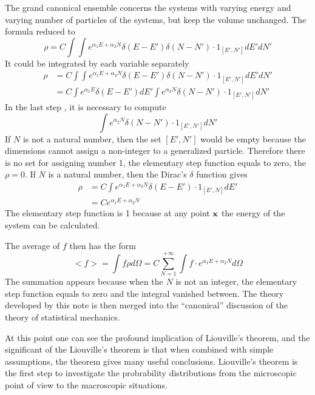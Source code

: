 The grand canonical ensemble concerns the systems with varying energy and varying number of particles of the systems, but keep the volume unchanged. The formula  reduced to
\begin{equation}
    \rho=C\int\int e^{\alpha_1E+\alpha_2N}\delta (E-E')\delta (N-N')\cdot 1_{[E',N']}dE'dN'
    \label{gce}
\end{equation}
It could be integrated by each variable separately
\begin{align}
    \rho&=C\int\int e^{\alpha_1E+\alpha_2N}\delta (E-E')\delta (N-N')\cdot 1_{[E',N']}dE'dN'\nonumber\\
    &=C\int e^{\alpha_1E}\delta (E-E')dE'\int e^{\alpha_2N}\delta (N-N')\cdot 1_{[E',N']}dN'\label{lastline}
\end{align}
In the last step , it is necessary to compute
\begin{equation}
    \int e^{\alpha_2N}\delta (N-N')\cdot 1_{[E',N']}dN'
    \label{ngce}
\end{equation}
If $N$ is not a natural number, then the set $[E',N']$ would be empty because the dimensions cannot assign a non-integer to a generalized particle.
Therefore there is no set for assigning number 1, the elementary step function equals to zero, the $\rho=0$. If $N$ is a natural number, then the Dirac's $\delta$ function gives
\begin{align}
    \rho &=C\int e^{\alpha_1E+\alpha_2N}\delta (E-E')\cdot 1_{[E',N]}dE'\nonumber\\
    &=Ce^{\alpha_1E+\alpha_2N}
    \label{calgce}
\end{align}
The elementary step function is 1 because at any point $\mathbf{x}$ the energy of the system can be calculated.

The average of $f$ then has the form
\begin{equation}
    <f>=\int f\rho d\Omega =C\sum_{N=1}^{+\infty}\int f\cdot e^{\alpha_1E+\alpha_2N} d\Omega
    \label{gceaverage}
\end{equation}
The summation appears because when the $N$ is not an integer, the elementary step function equals to zero and the integral vanished between.
The theory developed by this note is then merged into the ``canonical'' discussion of the theory of statistical mechanics.

At this point one can see the profound implication of Liouville's theorem, and the significant of the Liouville's theorem is that when combined with
simple assumptions, the theorem gives many useful conclusions. Liouville's theorem is the first step to investigate the probrability distributions from the microscopic point of view to the macroscopic situations. 
